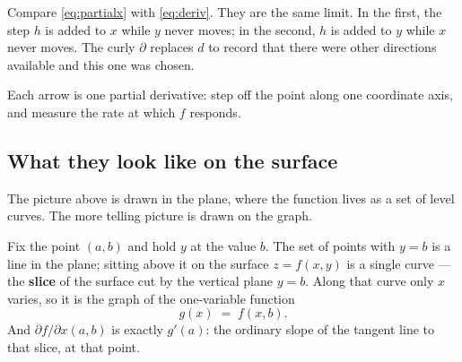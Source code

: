 \documentclass[11pt]{article}
\theoremstyle{plain}
\theoremstyle{definition}
\theoremstyle{remark}
\begin{document}
\noindent Compare \eqref{eq:partialx} with \eqref{eq:deriv}. They are the same
limit. In the first, the step $h$ is added to $x$ while $y$ never moves; in the
second, $h$ is added to $y$ while $x$ never moves. The curly $\partial$ replaces
$d$ to record that there were other directions available and this one was
chosen.

\begin{center}
\end{center}

\noindent Each arrow is one partial derivative: step off the point along one
coordinate axis, and measure the rate at which $f$ responds.

\subsection{What they look like on the surface}
The picture above is drawn in the plane, where the function lives as a set of
level curves. The more telling picture is drawn on the graph.

Fix the point $(a,b)$ and hold $y$ at the value $b$. The set of points with
$y=b$ is a line in the plane; sitting above it on the surface $z=f(x,y)$ is a
single curve --- the \textbf{slice} of the surface cut by the vertical plane
$y=b$. Along that curve only $x$ varies, so it is the graph of the one-variable
function
\[
  g(x) \;=\; f(x,b) .
\]
And $\partial f/\partial x(a,b)$ is exactly $g'(a)$: the ordinary slope of the
tangent line to that slice, at that point.
\end{document}
